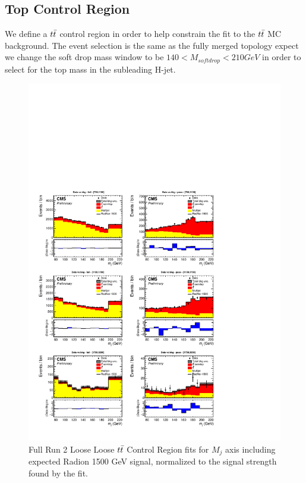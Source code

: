 \subsection{Top Control Region\label{ss:ttbarCR}}
We define a $t\bar{t} $ control region in order to help constrain the fit to the $t\bar{t} $ MC background. The event selection is the same as the fully merged topology expect we change the soft drop mass window to be $140 < M_{softdrop} < 210 GeV$ in order to select for the top mass in the subleading H-jet.
\begin{figure}[!htb]
	\centering
	\includegraphics[width=1\textwidth]{Figures/postfit_projx_fits_LLtt.pdf}
	\caption{Full Run 2 Loose Loose $t\bar{t} $ Control Region fits for $M_j$ axis including expected Radion 1500 GeV signal, normalized to the signal strength found by the fit.}
	\label{fig:LLttmj}
\end{figure}
